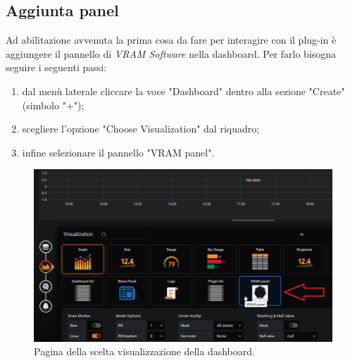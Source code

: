     \subsection{Aggiunta panel}
        Ad abilitazione avvenuta la prima cosa da fare per interagire con il plug-in è aggiungere il pannello di \textit{VRAM Software} nella dashboard\glo. Per farlo bisogna seguire i seguenti passi:
        \begin{enumerate}
            \item dal menù laterale cliccare la voce "Dashboard" dentro alla sezione "Create" (simbolo "+");
            \item scegliere l'opzione "Choose Visualization" dal riquadro;
            \item infine selezionare il pannello "VRAM panel".
        \end{enumerate}
        \begin{figure}[H]
            \includegraphics[width=\textwidth,height=\textheight,keepaspectratio]{img/aggiunta_plug-in.png}
            \caption{Pagina della scelta visualizzazione della dashboard\glo.}
        \end{figure}
